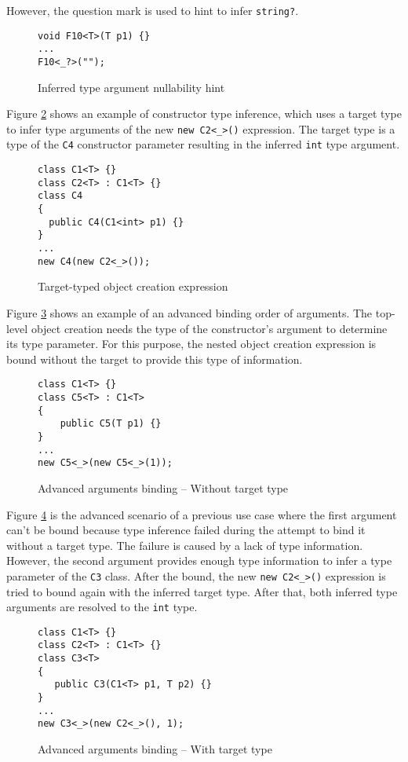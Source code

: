 However, the question mark is used to hint to infer \texttt{string?}.
\begin{figure}[!h]
\begin{lstlisting}[style=csharp, showstringspaces=false]
void F10<T>(T p1) {}
...
F10<_?>("");
\end{lstlisting}
\caption{Inferred type argument nullability hint}
\label{img75:example3}
\end{figure}
\par
Figure \ref{img76:example4} shows an example of constructor type inference, which uses a target type to infer type arguments of the new \texttt{new C2<\_>()} expression. 
The target type is a type of the \texttt{C4} constructor parameter resulting in the inferred \texttt{int} type argument.
\begin{figure}[!h]
\begin{lstlisting}[style=csharp, showstringspaces=false]
class C1<T> {}
class C2<T> : C1<T> {}
class C4 
{
  public C4(C1<int> p1) {}
}
...
new C4(new C2<_>());
\end{lstlisting}
\caption{Target-typed object creation expression}
\label{img76:example4}
\end{figure}
\par
Figure \ref{img77:example5} shows an example of an advanced binding order of arguments. 
The top-level object creation needs the type of the constructor’s argument to determine its type parameter. 
For this purpose, the nested object creation expression is bound without the target to provide this type of information.
\begin{figure}[!h]
\begin{lstlisting}[style=csharp, showstringspaces=false]
class C1<T> {}
class C5<T> : C1<T>
{
    public C5(T p1) {}
}
...
new C5<_>(new C5<_>(1));
\end{lstlisting}
\caption{Advanced arguments binding -- Without target type}
\label{img77:example5}
\end{figure}
\par
Figure \ref{img78:example6} is the advanced scenario of a previous use case where the first argument can’t be bound because type inference failed during the attempt to bind it without a target type.
The failure is caused by a lack of type information. 
However, the second argument provides enough type information to infer a type parameter of the \texttt{C3} class. 
After the bound, the new \texttt{new C2<\_>()} expression is tried to bound again with the inferred target type.
After that, both inferred type arguments are resolved to the \texttt{int} type.
\begin{figure}[!h]
\begin{lstlisting}[style=csharp, showstringspaces=false]
class C1<T> {}
class C2<T> : C1<T> {}
class C3<T>
{
   public C3(C1<T> p1, T p2) {}
}
...
new C3<_>(new C2<_>(), 1);
\end{lstlisting}
\caption{Advanced arguments binding -- With target type}
\label{img78:example6}
\end{figure}

